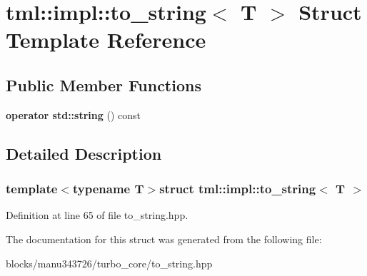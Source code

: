 \hypertarget{structtml_1_1impl_1_1to__string}{\section{tml\+:\+:impl\+:\+:to\+\_\+string$<$ T $>$ Struct Template Reference}
\label{structtml_1_1impl_1_1to__string}
}
\subsection*{Public Member Functions}
\begin{DoxyCompactItemize}
\item 
\hypertarget{structtml_1_1impl_1_1to__string_a760357ab5cc9db29bf44e7d20af100c9}{{\bfseries operator std\+::string} () const }\label{structtml_1_1impl_1_1to__string_a760357ab5cc9db29bf44e7d20af100c9}

\end{DoxyCompactItemize}


\subsection{Detailed Description}
\subsubsection*{template$<$typename T$>$struct tml\+::impl\+::to\+\_\+string$<$ T $>$}



Definition at line 65 of file to\+\_\+string.\+hpp.



The documentation for this struct was generated from the following file\+:\begin{DoxyCompactItemize}
\item 
blocks/manu343726/turbo\+\_\+core/to\+\_\+string.\+hpp\end{DoxyCompactItemize}
